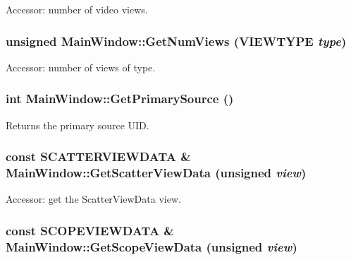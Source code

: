 Accessor: number of video views. 

\hypertarget{class_main_window_159ab0e8d3086f521b6e1f16d0f9cbd6}{
\subsubsection[{GetNumViews}]{\setlength{\rightskip}{0pt plus 5cm}unsigned MainWindow::GetNumViews ({\bf VIEWTYPE} {\em type})}}
\label{class_main_window_159ab0e8d3086f521b6e1f16d0f9cbd6}


Accessor: number of views of type. 

\hypertarget{class_main_window_88f79d4746ef5e14590f63fe213d55fd}{
\subsubsection[{GetPrimarySource}]{\setlength{\rightskip}{0pt plus 5cm}int MainWindow::GetPrimarySource ()}}
\label{class_main_window_88f79d4746ef5e14590f63fe213d55fd}


Returns the primary source UID. 

\hypertarget{class_main_window_56b41f77501d283ad234b327dacf1602}{
\subsubsection[{GetScatterViewData}]{\setlength{\rightskip}{0pt plus 5cm}const {\bf SCATTERVIEWDATA} \& MainWindow::GetScatterViewData (unsigned {\em view})}}
\label{class_main_window_56b41f77501d283ad234b327dacf1602}


Accessor: get the ScatterViewData view. 

\hypertarget{class_main_window_ba1d41fb8d4e492dfef340f6c9275fae}{
\subsubsection[{GetScopeViewData}]{\setlength{\rightskip}{0pt plus 5cm}const {\bf SCOPEVIEWDATA} \& MainWindow::GetScopeViewData (unsigned {\em view})}}
\label{class_main_window_ba1d41fb8d4e492dfef340f6c9275fae}


